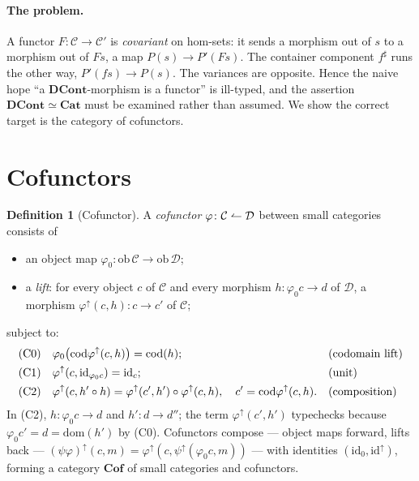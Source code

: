 \documentclass[11pt,a4paper]{article}
\newcommand{\Cat}{\mathbf{Cat}}
\newcommand{\Cof}{\mathbf{Cof}}
\newcommand{\DCont}{\mathbf{DCont}}
\newcommand{\id}{\mathrm{id}}
\newcommand{\cod}{\mathrm{cod}}
\newcommand{\dom}{\mathrm{dom}}
\newcommand{\ob}{\mathrm{ob}\,}
\newcommand{\co}{\mathrel{\text{\reflectbox{$\rightharpoonup$}}}}
\theoremstyle{definition}\newtheorem{definition}{Definition}[section]
\theoremstyle{plain}\newtheorem{proposition}[definition]{Proposition}
\theoremstyle{remark}\newtheorem{example}[definition]{Example}
\begin{document}
\paragraph{The problem.} A functor $F\colon\mathcal C\to\mathcal C'$ is
\emph{covariant} on hom-sets: it sends a morphism out of $s$ to a morphism out
of $Fs$, a map $P(s)\to P'(Fs)$. The container component $f^\sharp$ runs the
other way, $P'(fs)\to P(s)$. The variances are opposite. Hence the naive hope
``a $\DCont$-morphism is a functor'' is ill-typed, and the assertion
$\DCont\simeq\Cat$ must be examined rather than assumed. We show the correct
target is the category of cofunctors.

\section{Cofunctors}

\begin{definition}[Cofunctor]\label{def:cof}
A \emph{cofunctor} $\varphi\colon\mathcal C\co\mathcal D$ between small
categories consists of
\begin{itemize}[nosep]
  \item an object map $\varphi_0\colon\ob\mathcal C\to\ob\mathcal D$;
  \item a \emph{lift}: for every object $c$ of $\mathcal C$ and every morphism
        $h\colon\varphi_0 c\to d$ of $\mathcal D$, a morphism
        $\varphi^\uparrow(c,h)\colon c\to c'$ of $\mathcal C$;
\end{itemize}
subject to:
\begin{align}
  &\text{(C0)} && \varphi_0\big(\cod\varphi^\uparrow(c,h)\big)=\cod(h);
        &&\text{(codomain lift)}\notag\\
  &\text{(C1)} && \varphi^\uparrow(c,\id_{\varphi_0 c})=\id_c;
        &&\text{(unit)}\notag\\
  &\text{(C2)} && \varphi^\uparrow(c,h'\circ h)
                   =\varphi^\uparrow(c',h')\circ\varphi^\uparrow(c,h),
        \quad c'=\cod\varphi^\uparrow(c,h). &&\text{(composition)}\notag
\end{align}
In (C2), $h\colon\varphi_0 c\to d$ and $h'\colon d\to d''$; the term
$\varphi^\uparrow(c',h')$ typechecks because $\varphi_0 c'=d=\dom(h')$ by (C0).
Cofunctors compose --- object maps forward, lifts back ---
$(\psi\varphi)^\uparrow(c,m)=\varphi^\uparrow(c,\psi^\uparrow(\varphi_0 c,m))$
--- with identities $(\id_0,\id^\uparrow)$, forming a category $\Cof$ of small
categories and cofunctors.
\end{definition}
\end{document}
